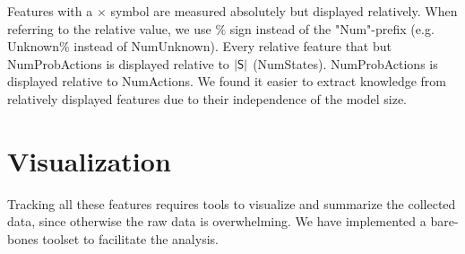 \iffalse
$\mathbf{MEC-related:}$
\begin{itemize}
\item (NumMECs) Number of MECs
\item (BiggestMEC, SmallestMEC) Size of biggest and smallest MEC*
\item (AvgMEC, MedianMEC) Average MEC size and Median MEC size*
\end{itemize}

$\mathbf{SCC-related:}$
\begin{itemize}
\item (NumSCCs) Number of SCCs
\item (BiggestSCC, SmallestSCC) Size of biggest and smallest SCC*
\item (AvgSCC, MedianSCC) Average SCC-size and Median SCC-size*
\item (MaxSCCDepth) Longest chain of SCCs from the initial-state SCC
\item (NumSCCNonSingleton) Number of SCCs with cardinality bigger than 1
\item (SmallestSCCNonSingleton) Smallest SCC with cardinality bigger than 1
\item (AvgSCCNonSingleton) Average SCC size with cardinality bigger than 1*
\end{itemize}

$\mathbf{Path-related}:$
\begin{itemize}
    \item (NearestTarget) Shortest Path from initial state to the nearest target
    \item (FurthestTarget) Shortest Path from initial state to the furthest target
\end{itemize}
\fi

Features with a $\times$ symbol are measured absolutely but displayed relatively. 
When referring to the relative value, we use $\%$ sign instead of the "Num"-prefix (e.g. Unknown\% instead of NumUnknown).
Every relative feature that but NumProbActions is displayed relative to $|\mathsf{S}|$ (NumStates). NumProbActions is displayed relative to NumActions.
We found it easier to extract knowledge from relatively displayed features due to their independence of the model size. 

\section*{Visualization}

Tracking all these features requires tools to visualize and summarize the collected data, since otherwise the raw data is overwhelming.
We have implemented a bare-bones toolset to facilitate the analysis. 

